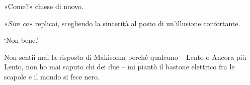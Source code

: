«Come?» chiese di nuovo.

«\emph{Sim ca}» replicai, scegliendo la sincerità al posto di
un'illusione confortante.

`Non bene.'

Non sentii mai la risposta di Makisomn perché qualcuno -- Lento o Ancora
più Lento, non ho mai saputo chi dei due -- mi piantò il bastone
elettrico fra le scapole e il mondo si fece nero.

